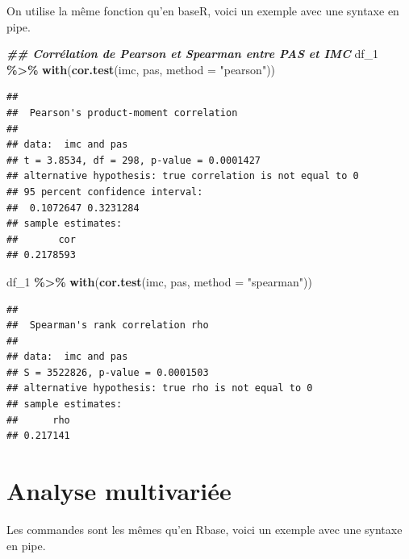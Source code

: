 \documentclass[
]{book}
\newenvironment{Shaded}{\begin{snugshade}}{\end{snugshade}}
\newcommand{\AttributeTok}[1]{\textcolor[rgb]{0.13,0.29,0.53}{#1}}
\newcommand{\DocumentationTok}[1]{\textcolor[rgb]{0.56,0.35,0.01}{\textbf{\textit{#1}}}}
\newcommand{\FunctionTok}[1]{\textcolor[rgb]{0.13,0.29,0.53}{\textbf{#1}}}
\newcommand{\NormalTok}[1]{#1}
\newcommand{\SpecialCharTok}[1]{\textcolor[rgb]{0.81,0.36,0.00}{\textbf{#1}}}
\newcommand{\StringTok}[1]{\textcolor[rgb]{0.31,0.60,0.02}{#1}}
\begin{document}
On utilise la même fonction qu'en baseR, voici un exemple avec une syntaxe en pipe.

\begin{Shaded}
\begin{Highlighting}[]
\DocumentationTok{\#\# Corrélation de Pearson et Spearman entre PAS et IMC}
\NormalTok{df\_1 }\SpecialCharTok{\%\textgreater{}\%} \FunctionTok{with}\NormalTok{(}\FunctionTok{cor.test}\NormalTok{(imc, pas, }\AttributeTok{method =} \StringTok{"pearson"}\NormalTok{))}
\end{Highlighting}
\end{Shaded}

\begin{verbatim}
## 
##  Pearson's product-moment correlation
## 
## data:  imc and pas
## t = 3.8534, df = 298, p-value = 0.0001427
## alternative hypothesis: true correlation is not equal to 0
## 95 percent confidence interval:
##  0.1072647 0.3231284
## sample estimates:
##       cor 
## 0.2178593
\end{verbatim}

\begin{Shaded}
\begin{Highlighting}[]
\NormalTok{df\_1 }\SpecialCharTok{\%\textgreater{}\%} \FunctionTok{with}\NormalTok{(}\FunctionTok{cor.test}\NormalTok{(imc, pas, }\AttributeTok{method =} \StringTok{"spearman"}\NormalTok{))}
\end{Highlighting}
\end{Shaded}

\begin{verbatim}
## 
##  Spearman's rank correlation rho
## 
## data:  imc and pas
## S = 3522826, p-value = 0.0001503
## alternative hypothesis: true rho is not equal to 0
## sample estimates:
##      rho 
## 0.217141
\end{verbatim}

\section{Analyse multivariée}\label{analyse-multivariuxe9e-2}

Les commandes sont les mêmes qu'en Rbase, voici un exemple avec une syntaxe en pipe.
\end{document}
